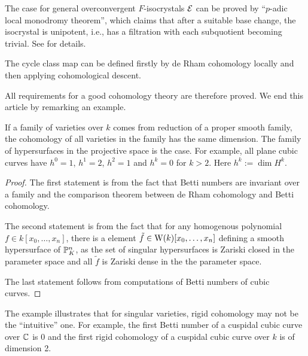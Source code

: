 \begin{remark}
    The case for general overconvergent $F$-isocrystals ${\mathcal {E}}$ 
    can be proved by ``$p$-adic local monodromy theorem'', 
    which claims that after a suitable base change, 
    the isocrystal is unipotent, i.e., 
    has a filtration with each subquotient becoming trivial. 
    See \cite{Ke1} for details.
\end{remark}

\begin{remark}
    The cycle class map can be defined 
    firstly by de Rham cohomology locally 
    and then applying cohomological descent.
\end{remark}

All requirements for a good cohomology theory are therefore proved. 
We end this article by remarking an example.
\begin{example}
    If a family of varieties over $k$ comes from reduction of a proper smooth family, 
    the cohomology of all varieties in the family has the same dimension. 
    The family of hypersurfaces in the projective space is the case. 
    For example, all plane cubic curves have 
    $h^0 = 1$, $h^1 = 2$, $h^2=1$ and $h^k = 0$ for $k > 2$. 
    Here $h^k := \dim H^k$.
\end{example}

\begin{proof}
    The first statement is from the fact that 
    Betti numbers are invariant over a family and 
    the comparison theorem between de Rham cohomology and Betti cohomology. 

    The second statement is from the fact that 
    for any homogenous polynomial $f\in k[x_0, \dots, x_n]$, 
    there is a element $\tilde{f} \in \mathrm{W}(k)[x_0, \dots, x_n]$ 
    defining a smooth hypersurface of ${\mathbb {P}}_K^n$, 
    as the set of singular hypersurfaces is Zariski closed in the parameter space 
    and all $\tilde{f}$ is Zariski dense in the the parameter space.

    The last statement follows from computations of Betti numbers of cubic curves. 
\end{proof}

The example illustrates that for singular varieties, 
rigid cohomology may not be the ``intuitive'' one. 
For example, the first Betti number of a cuspidal cubic curve over ${\mathbb {C}}$ is $0$ 
and the first rigid cohomology of a cuspidal cubic curve over $k$ is of dimension 2. 